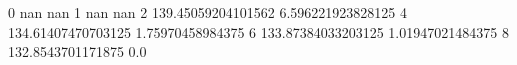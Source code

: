 0 nan nan
1 nan nan
2 139.45059204101562 6.596221923828125
4 134.61407470703125 1.75970458984375
6 133.87384033203125 1.01947021484375
8 132.8543701171875 0.0
